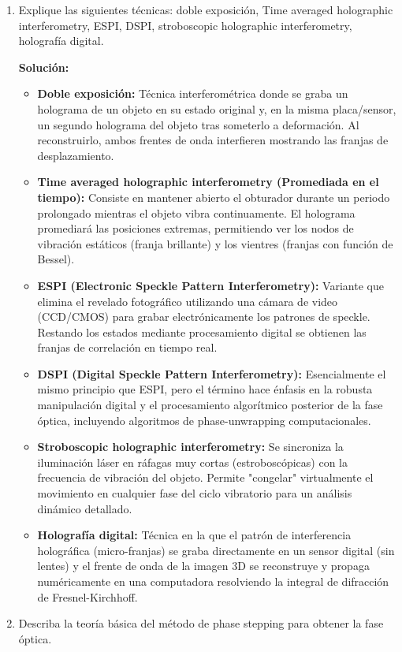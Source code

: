 \documentclass[12pt, letterpaper]{article}
\begin{document}
\begin{enumerate}
		\item Explique las siguientes técnicas: doble exposición, Time averaged holographic interferometry, ESPI, DSPI, stroboscopic holographic interferometry, holografía digital. 
		
		\textbf{Solución:}
		\begin{itemize}
			\item \textbf{Doble exposición:} Técnica interferométrica donde se graba un holograma de un objeto en su estado original y, en la misma placa/sensor, un segundo holograma del objeto tras someterlo a deformación. Al reconstruirlo, ambos frentes de onda interfieren mostrando las franjas de desplazamiento.
			\item \textbf{Time averaged holographic interferometry (Promediada en el tiempo):} Consiste en mantener abierto el obturador durante un periodo prolongado mientras el objeto vibra continuamente. El holograma promediará las posiciones extremas, permitiendo ver los nodos de vibración estáticos (franja brillante) y los vientres (franjas con función de Bessel).
			\item \textbf{ESPI (Electronic Speckle Pattern Interferometry):} Variante que elimina el revelado fotográfico utilizando una cámara de video (CCD/CMOS) para grabar electrónicamente los patrones de speckle. Restando los estados mediante procesamiento digital se obtienen las franjas de correlación en tiempo real.
			\item \textbf{DSPI (Digital Speckle Pattern Interferometry):} Esencialmente el mismo principio que ESPI, pero el término hace énfasis en la robusta manipulación digital y el procesamiento algorítmico posterior de la fase óptica, incluyendo algoritmos de phase-unwrapping computacionales.
			\item \textbf{Stroboscopic holographic interferometry:} Se sincroniza la iluminación láser en ráfagas muy cortas (estroboscópicas) con la frecuencia de vibración del objeto. Permite "congelar" virtualmente el movimiento en cualquier fase del ciclo vibratorio para un análisis dinámico detallado.
			\item \textbf{Holografía digital:} Técnica en la que el patrón de interferencia holográfica (micro-franjas) se graba directamente en un sensor digital (sin lentes) y el frente de onda de la imagen 3D se reconstruye y propaga numéricamente en una computadora resolviendo la integral de difracción de Fresnel-Kirchhoff.
		\end{itemize}
		
		\item Describa la teoría básica del método de phase stepping para obtener la fase óptica. 
		

\end{enumerate}
\end{document}
